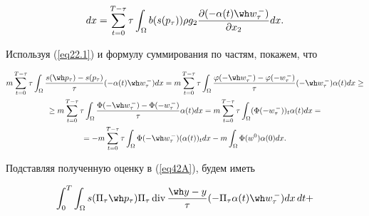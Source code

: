 \begin{pf}
\begin{multline}
dx =\sum_{t=0}^{T-\tau} \tau \int_{\Omega}


b(s(p_{\tau})) \rho g_{2} \frac{\partial (- \alpha (t) \wh w_{\tau}^{\,-})}


{\partial x_{2}} dx.


\end{multline}


Используя (\ref{eq22.1}) и формулу суммирования по частям, покажем, что


\begin{multline*}


m \sum_{t=0}^{T-\tau} \tau \int_{\Omega}


\frac{s(\wh p_{\tau})-s(p_{\tau})}{\tau} (- \alpha (t) \wh w^{\,-}_{\tau})


dx =m \sum_{t=0}^{T-\tau} \tau \int_{\Omega}


\frac{\varphi(-\wh w_{\tau}^{\,-})-\varphi(-w_{\tau}^{\,-})}{\tau}


(- \wh w^{\,-}_{\tau})\alpha(t) dx \geq \\


%


\geq m \sum_{t=0}^{T-\tau} \tau \int_{\Omega}


\frac{\Phi(- \wh w_{\tau}^{\,-}) - \Phi(-w_{\tau}^{\,-})}{\tau}


\alpha(t) dx = m \sum_{t=0}^{T-\tau} \tau \int_{\Omega}


(\Phi(-w_{\tau}^{\,-}))_{t} \alpha(t) dx = \\


%


= - m \sum_{t=0}^{T-\tau} \tau \int_{\Omega}


\Phi(-\wh w_{\tau}^{\,-}) (\alpha(t))_{t} dx - 


m \int_{\Omega} \Phi(w^{0}) \alpha(0) dx.


\end{multline*}





Подставляя полученную оценку в (\ref{eq42A}), будем иметь


\begin{multline}


\int_{0}^{T} \int_{\Omega} s(\Pi_{\tau}


\wh p_{\tau}) \Pi_{\tau} \Div 


\frac{\wh y - y}{\tau} (- \Pi_{\tau} \alpha(t) \wh w_{\tau}^{\,-}) dx\,dt +\\


%



\end{multline}
\end{pf}
